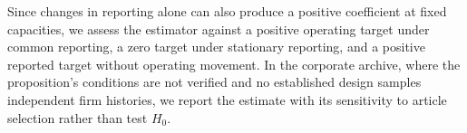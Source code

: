 Since changes in reporting alone can also produce a positive coefficient at
fixed capacities, we assess the estimator against a positive operating target
under common reporting, a zero target under stationary reporting, and a positive
reported target without operating movement.
In the corporate archive, where the proposition's conditions are not verified
and no established design samples independent firm histories, we report the
estimate with its sensitivity to article selection
rather than test $H_0$.
